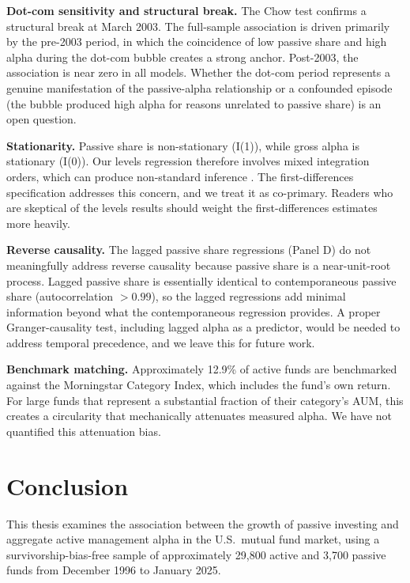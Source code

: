 \documentclass[11pt, a4paper]{article}
\begin{document}
\textbf{Dot-com sensitivity and structural break.} The Chow test confirms a structural break at March 2003. The full-sample association is driven primarily by the pre-2003 period, in which the coincidence of low passive share and high alpha during the dot-com bubble creates a strong anchor. Post-2003, the association is near zero in all models. Whether the dot-com period represents a genuine manifestation of the passive-alpha relationship or a confounded episode (the bubble produced high alpha for reasons unrelated to passive share) is an open question.

\textbf{Stationarity.} Passive share is non-stationary (I(1)), while gross alpha is stationary (I(0)). Our levels regression therefore involves mixed integration orders, which can produce non-standard inference \parencite{phillips1986}. The first-differences specification addresses this concern, and we treat it as co-primary. Readers who are skeptical of the levels results should weight the first-differences estimates more heavily.

\textbf{Reverse causality.} The lagged passive share regressions (Panel D) do not meaningfully address reverse causality because passive share is a near-unit-root process. Lagged passive share is essentially identical to contemporaneous passive share (autocorrelation $>0.99$), so the lagged regressions add minimal information beyond what the contemporaneous regression provides. A proper Granger-causality test, including lagged alpha as a predictor, would be needed to address temporal precedence, and we leave this for future work.

\textbf{Benchmark matching.} Approximately 12.9\% of active funds are benchmarked against the Morningstar Category Index, which includes the fund's own return. For large funds that represent a substantial fraction of their category's AUM, this creates a circularity that mechanically attenuates measured alpha. We have not quantified this attenuation bias.


\section{Conclusion}
\label{sec:conclusion}

This thesis examines the association between the growth of passive investing and aggregate active management alpha in the U.S.\ mutual fund market, using a survivorship-bias-free sample of approximately 29,800 active and 3,700 passive funds from December 1996 to January 2025.
\end{document}
